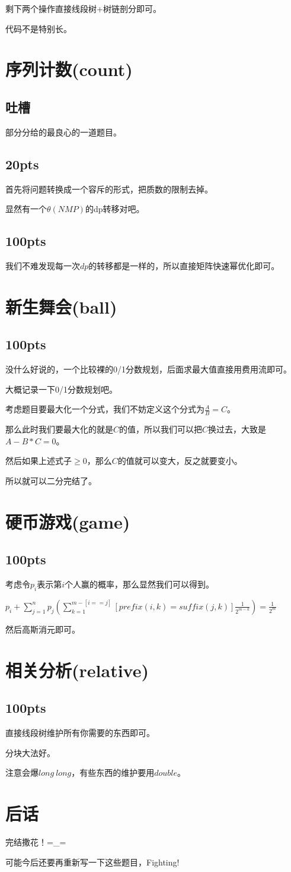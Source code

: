 \documentclass[UTF-8]{ctexart}
\begin{document}
	剩下两个操作直接线段树+树链剖分即可。
	
	代码不是特别长。
	\section{序列计数(count)}
	\subsection{吐槽}
	部分分给的最良心的一道题目。
	\subsection{20pts}
	首先将问题转换成一个容斥的形式，把质数的限制去掉。
	
	显然有一个$\theta(NMP)$的dp转移对吧。
	\subsection{100pts}
	我们不难发现每一次$dp$的转移都是一样的，所以直接矩阵快速幂优化即可。
	\section{新生舞会(ball)}
	\subsection{100pts}
	没什么好说的，一个比较裸的0/1分数规划，后面求最大值直接用费用流即可。
	
	大概记录一下0/1分数规划吧。
	
	考虑题目要最大化一个分式，我们不妨定义这个分式为$\frac{A}{B}=C$。
	
	那么此时我们要最大化的就是$C$的值，所以我们可以把$C$换过去，大致是$A-B*C=0$。
	
	然后如果上述式子$\ge 0$，那么$C$的值就可以变大，反之就要变小。
	
	所以就可以二分完结了。
	\section{硬币游戏(game)}
	\subsection{100pts}
	考虑令$p_i$表示第$i$个人赢的概率，那么显然我们可以得到。
	
	$p_i+\sum_{j=1}^np_j(\sum_{k=1}^{m-[i==j]}[prefix(i,k)=suffix(j,k)]\frac{1}{2^{m-k}}) = \frac{1}{2^m}$
	
	然后高斯消元即可。
	\section{相关分析(relative)}
	\subsection{100pts}
	直接线段树维护所有你需要的东西即可。
	
	分块大法好。
	
	注意会爆$long\ long$，有些东西的维护要用$double$。
	\section{后话}
	完结撒花！=\_=
	
	可能今后还要再重新写一下这些题目，Fighting!
\end{document}
